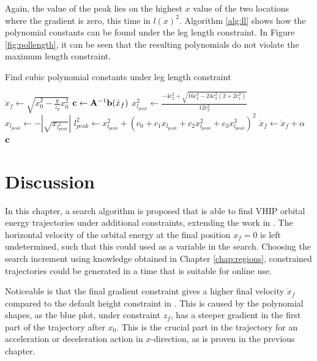 Again, the value of the peak lies on the highest $x$ value of the two locations where the gradient is zero, this time in $l(x)^2$. Algorithm \ref{alg:ll} shows how the polynomial constants can be found under the leg length constraint. In Figure \ref{fig:pollength}, it can be seen that the resulting polynomials do not violate the maximum length constraint.
\begin{algorithm}
\caption{Find cubic polynomial constants under leg length constraint}
\label{alg:ll}
\begin{algorithmic}[1]
    \State $\dot{x}_{f}\gets \sqrt{\dot{x}_0^2-\frac{g}{z_0}x_0^2}$
        \Repeat
            \State $\mathbf{c}\gets \mathbf{A}^{-1}\mathbf{b}(\dot{x}_{f})$ 
            \State $x_{l_{peak}}^2 \gets \frac{-4c_2^2+\sqrt{16c_2^4-24c_3^2(2+2c_1^2)}}{12c_3^2}$   
            \State $x_{l_{peak}}\gets-|\sqrt{x_{l_{peak}^2}}|$                
            \State $l_{peak}^2 \gets x_{l_{peak}}^2 + (c_0 + c_1x_{l_{peak}} + c_2x_{l_{peak}}^2+ c_3x_{l_{peak}}^3)^2$ 
            \State $\dot{x}_{f} \gets \dot{x}_{f}+\alpha$   
        \\
    \Return $\mathbf{c}$    
\end{algorithmic}
\end{algorithm}
\section{Discussion}
In this chapter, a search algorithm is proposed that is able to find \ac{VHIP} orbital energy trajectories under additional constraints, extending the work in \cite{koolen2016balance}. The horizontal velocity of the orbital energy at the final position $x_f=0$ is left undetermined, such that this could used as a variable in the search. Choosing the search increment using knowledge obtained in Chapter \ref{chap:regions}, constrained trajectories could be generated in a time that is suitable for online use. 

Noticeable is that the final gradient constraint gives a higher final velocity $\dot{x}_f$ compared to the default height constraint in . This is caused by the polynomial shapes, as the blue plot, under constraint $z_f$, has a steeper gradient in the first part of the trajectory after $x_0$. This is the crucial part in the trajectory for an acceleration or deceleration action in $x$-direction, as is proven in the previous chapter.

